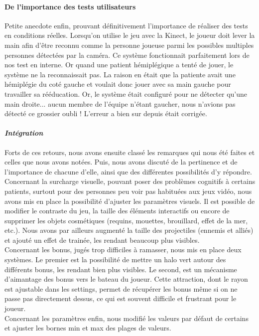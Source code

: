 \paragraph{De l'importance des tests utilisateurs\\}Petite anecdote enfin, prouvant définitivement l'importance de réaliser des tests en conditions réelles. Lorsqu'on utilise le jeu avec la Kinect, le joueur doit lever la main afin d'être reconnu comme la personne joueuse parmi les possibles multiples personnes détectées par la caméra. Ce système fonctionnait parfaitement lors de nos test en interne. Or quand une patient hémiplégique a tenté de jouer, le système ne la reconnaissait pas. La raison en était que la patiente avait une hémiplégie du coté gauche et voulait donc jouer avec sa main gauche pour travailler sa rééducation. Or, le système était configuré pour ne détecter qu'une main droite... aucun membre de l'équipe n'étant gaucher, nous n'avions pas détecté ce grossier oubli ! L'erreur a bien sur depuis était corrigée.

	\paragraph{\emph{Intégration}\\}
	Forts de ces retours, nous avons ensuite classé les remarques qui nous été faites et celles que nous avons notées. Puis, nous avons discuté de la pertinence et de l'importance de chacune d'elle, ainsi que des différentes possibilités d'y répondre. \\
	Concernant la surcharge visuelle, pouvant poser des problèmes cognitifs à certains patients, surtout pour des personnes peu voir pas habituées aux jeux vidéo, nous avons mis en place la possibilité d'ajuster les paramètres visuels. Il est possible de modifier le contraste du jeu, la taille des éléments interactifs ou encore de supprimer les objets cosmétiques (requins, mouettes, brouillard, effet de la mer, etc.). Nous avons par ailleurs augmenté la taille des projectiles (ennemis et alliés) et ajouté un effet de trainée, les rendant beaucoup plus visibles.\\
	Concernant les bonus, jugés trop difficiles à ramasser, nous mis en place deux systèmes. Le premier est la possibilité de mettre un halo vert autour des différents bonus, les rendant bien plus visibles. Le second, est un mécanisme d'aimantage des bonus vers le bateau du joueur. Cette attraction, dont le rayon est ajustable dans les settings, permet de récupérer les bonus même si on ne passe pas directement dessus, ce qui est souvent difficile et frustrant pour le joueur.\\
Concernant les paramètres enfin, nous modifié les valeurs par défaut de certains et ajuster les bornes min et max des plages de valeurs.


